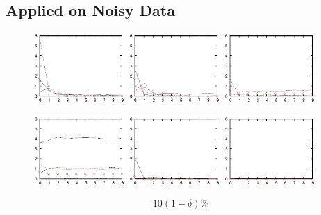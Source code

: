 \documentclass{beamer}
\begin{document}
\subsection{Applied on Noisy Data}
\begin{frame}
  \begin{figure}
    \begin{center}
      \includegraphics[width=3.5cm]{fig/err/ea1.eps}
      \includegraphics[width=3.5cm]{fig/err/ea2.eps}
      \includegraphics[width=3.5cm]{fig/err/ea3.eps}
    \end{center}
    \begin{center}
      \includegraphics[width=3.5cm]{fig/err/ea4.eps}
      \includegraphics[width=3.5cm]{fig/err/ea5.eps}
      \includegraphics[width=3.5cm]{fig/err/ea6.eps}
    \end{center}
  \end{figure}
  \begin{equation*}
    10(1-\delta)\%
  \end{equation*}
\end{frame}
\end{document}
